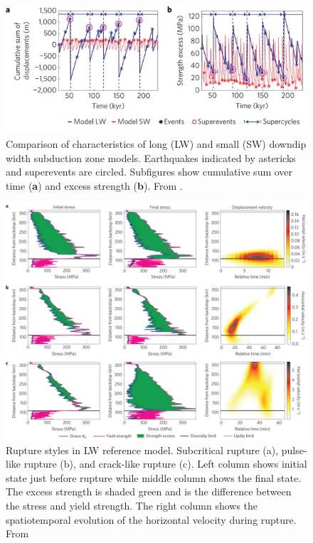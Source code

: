 \documentclass[]{proposalnsf}
\begin{document}
\begin{figure}
	\includegraphics[width=1\linewidth]{Figures/Herrendorfer/ngeo2427-f2_edit.jpg}
	\caption{Comparison of characteristics of long (LW) and small (SW) downdip width subduction zone models. Earthquakes indicated by astericks and superevents are circled. Subfigures show cumulative sum over time ({\bf a}) and excess strength ({\bf b}). From \citet{Herrendorfer2015}.}
	\label{fig:SZOwidth}
\end{figure}
\begin{figure}
	\includegraphics[width=1\linewidth]{Figures/Herrendorfer/ngeo2427-f3.jpeg}
	\caption{Rupture styles in LW reference model. Subcritical rupture (a), pulse-like rupture (b), and crack-like rupture (c). Left column shows initial state just before rupture while middle column shows the final state. The excess strength is shaded green and is the difference between the stress and yield strength. The right column shows the spatiotemporal evolution of the horizontal velocity during rupture. From \citet{Herrendorfer2015}}
	\label{fig:ruptureStyle}
\end{figure}
\end{document}
